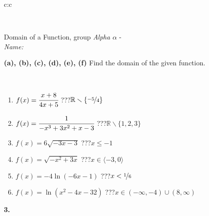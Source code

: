 \documentclass[10pt]{report}
\begin{document}
\begin{tabular}{c:c}
\begin{minipage}[c][104.5mm][t]{0.5\linewidth}
\begin{center}
\begin{minipage}{0.20\linewidth}
\end{minipage}
\end{center}
\end{minipage}
\\ \hdashline
\begin{minipage}[c][104.5mm][t]{0.5\linewidth}
\begin{center}
\vspace{7mm}
{\huge Domain of a Function, group \textit{Alpha $\alpha$} -}\\[5mm]
\textit{Name:}\phantom{xxxxxxxxxxxxxxxxxxxxxxxxxxxxxxxxxxxxxxxxxxxxxxxxxxxxxxxxxxxxxxxxx}\\[5mm]
\begin{minipage}{0.95\linewidth}
\begin{center}
{
\textbf{(a), (b), (c), (d), (e), (f)} Find the domain of the given function. \\[1mm]
\phantom{x}
}
\end{center}
\end{minipage}
\\[4mm]
\begin{minipage}{0.79\linewidth}
\begin{center}
\begin{varwidth}{\linewidth}
\begin{enumerate}
\normalsizerrr
\item $f(x)=\cfrac{x+8}{4x+5}$\quad \dotfill\; ???\;\dotfill \quad $ \mathbb{R} \smallsetminus\{\nicefrac{-5}{4} \}$
\item $f(x)=\cfrac{1}{-x^3+3x^2+x-3}$\quad \dotfill\; ???\;\dotfill \quad $ \mathbb{R} \smallsetminus\{1,2,3 \}$
\item $f(x)=6\sqrt{-3x-3}$\quad \dotfill\; ???\;\dotfill \quad $x\leq-1$
\item $f(x)=\sqrt{-x^2+3x}$\quad \dotfill\; ???\;\dotfill \quad $x\in\langle-3 , 0\rangle$
\item $f(x)=-4\ln{(-6x-1)}$\quad \dotfill\; ???\;\dotfill \quad $x<\nicefrac{1}{6}$
\item $f(x)=\ln{(x^2-4x-32)}$\quad \dotfill\; ???\;\dotfill \quad $x\in(-\infty , -4)\cup(8 , \infty)$
\end{enumerate}
\end{varwidth}
\end{center}
\end{minipage}
\begin{minipage}{0.20\linewidth}
\begin{center}
{\Huge\bfseries 3.} \\[2mm]

\end{center}
\end{minipage}
\end{center}
\end{minipage}
\end{tabular}
\end{document}
